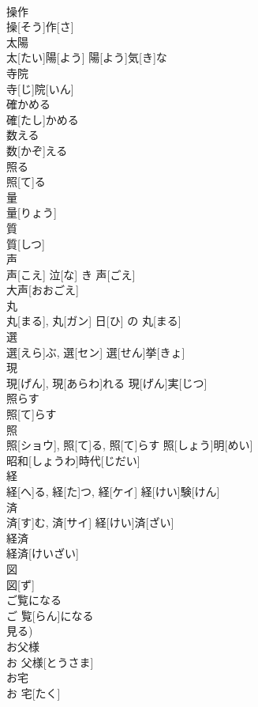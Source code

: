 \documentclass[8pt]{extreport}
\begin{document}
\begin{CJK}{UTF8}{min}
\\	操作	
\\	操[そう]作[さ]	
\\	太陽	
\\	太[たい]陽[よう]	陽[よう]気[き]な 
\\	寺院	
\\	寺[じ]院[いん]	
\\	確かめる	
\\	確[たし]かめる	
\\	数える	
\\	数[かぞ]える	
\\	照る	
\\	照[て]る	
\\	量	
\\	量[りょう]	
\\	質	
\\	質[しつ]	
\\	声	
\\	声[こえ]	泣[な] き 声[ごえ] 
\\	大声[おおごえ] 
\\	丸	
\\	丸[まる], 丸[ガン]	日[ひ] の 丸[まる] 
\\	選	
\\	選[えら]ぶ, 選[セン]	選[せん]挙[きょ] 
\\	現	
\\	現[げん], 現[あらわ]れる	現[げん]実[じつ] 
\\	照らす	
\\	照[て]らす	
\\	照	
\\	照[ショウ], 照[て]る, 照[て]らす	照[しょう]明[めい] 
\\	昭和[しょうわ]時代[じだい] 
\\	経	
\\	経[へ]る, 経[た]つ, 経[ケイ]	経[けい]験[けん] 
\\	済	
\\	済[す]む, 済[サイ]	経[けい]済[ざい] 
\\	経済	
\\	経済[けいざい]	
\\	図	
\\	図[ず]	
\\	ご覧になる	
\\	ご 覧[らん]になる	
\\	見る)
\\	お父様	
\\	お 父様[とうさま]	
\\	お宅	
\\	お 宅[たく]	

\end{CJK}
\end{document}

